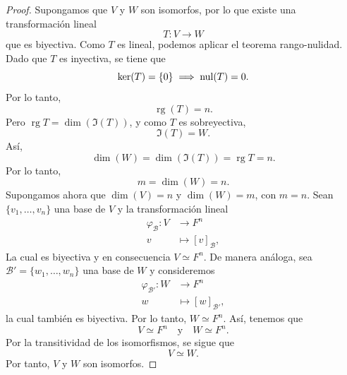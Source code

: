 \documentclass[12pt,a4paper]{book}
\DeclareMathOperator{\rg}{rg}
\begin{document}
    \begin{proof}
        Supongamos que $V$ y $W$ son isomorfos, por lo que existe una transformación lineal
        \begin{equation*}
            T:V \to W
        \end{equation*}
        que es biyectiva. Como $T$ es lineal, podemos aplicar el teorema rango-nulidad. Dado que $T$ es inyectiva, se tiene que
        \begin{equation*}
            \ker(T) = \{0\} \implies \operatorname{nul}(T) = 0.
        \end{equation*}
        Por lo tanto,
        \begin{equation*}
            \rg(T) = n.
        \end{equation*}
        Pero $\rg{T} = \dim(\Im(T))$, y como $T$ es sobreyectiva,
        \begin{equation*}
            \Im(T) = W.
        \end{equation*}
        Así,
        \begin{equation*}
            \dim(W) = \dim(\Im(T)) = \rg{T} = n.
        \end{equation*}
        Por lo tanto,
        \begin{equation*}
            m = \dim(W) = n.
        \end{equation*}
        Supongamos ahora que $\dim(V) = n$ y $\dim(W) = m$, con $m = n$.
        Sean $\{v_1,\dots,v_n\}$ una base de $V$ y la transformación lineal
        \begin{align*}
            \varphi_{\mathcal{B}}:V & \to F^{n}\\
            v & \mapsto [v]_{\mathcal{B}},
        \end{align*}
        La cual es biyectiva y en consecuencia $V \simeq F^n$. De manera análoga, sea $\mathcal{B}' = \{w_1,\dots,w_n\}$ una base de $W$ y consideremos
        \begin{align*}
            \varphi_{\mathcal{B}'}:W & \to F^n\\
            w & \mapsto [w]_{\mathcal{B}'},
        \end{align*}
        la cual también es biyectiva. Por lo tanto, $W \simeq F^n$. Así, tenemos que
        \begin{equation*}
            V \simeq F^n \quad \text{y} \quad W \simeq F^n.
        \end{equation*}
        Por la transitividad de los isomorfismos, se sigue que
        \begin{equation*}
            V \simeq W.
        \end{equation*}
        Por tanto, $V$ y $W$ son isomorfos.
    \end{proof}
    
\end{document}
